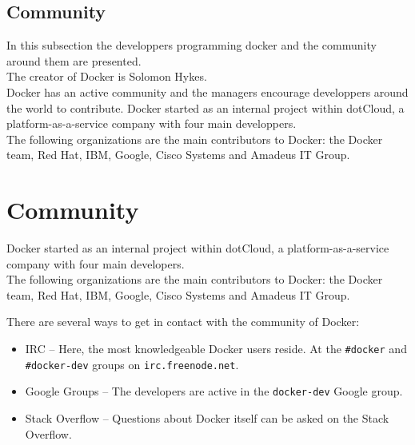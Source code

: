 \subsection{Community}
In this subsection the developpers programming docker and the community around them are presented. \\
The creator of Docker is Solomon Hykes. \\
Docker has an active community and the managers encourage developpers around the world to contribute. 
Docker started as an internal project within dotCloud, a platform-as-a-service company with four main developpers. \\
The following organizations are the main contributors to Docker: the Docker team, Red Hat, IBM, Google, Cisco Systems and Amadeus IT Group. \\


\section{Community}
Docker started as an internal project within dotCloud, a platform-as-a-service company with four main developers. \\
The following organizations are the main contributors to Docker: the Docker team, Red Hat, IBM, Google, Cisco Systems and Amadeus IT Group. 

There are several ways to get in contact with the community of Docker:
\begin{itemize}
\item IRC -- Here, the most knowledgeable Docker users reside. At the \verb|#docker| and \verb|#docker-dev| groups on \verb|irc.freenode.net|.

\item Google Groups -- The developers are active in the \verb|docker-dev| Google group.

\item Stack Overflow -- Questions about Docker itself can be asked on the Stack Overflow. 

\end{itemize}

